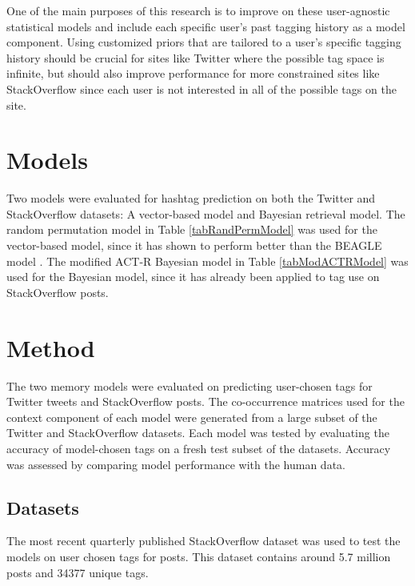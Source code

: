 \documentclass[man,floatsintext,donotrepeattitle]{apa6}
\begin{document}
One of the main purposes of this research is to improve on these user-agnostic statistical models and include each specific user's past tagging history as a model component.
Using customized priors that are tailored to a user's specific tagging history should be crucial for sites like Twitter where the possible tag space is infinite,
but should also improve performance for more constrained sites like StackOverflow since each user is not interested in all of the possible tags on the site. 

\section{Models}

Two models were evaluated for hashtag prediction on both the Twitter and StackOverflow datasets:
A vector-based model and Bayesian retrieval model.
The random permutation model \parencite{Sahlgren2008} in Table \ref{tabRandPermModel} was used for the vector-based model, since it has shown to perform better than the BEAGLE model \parencite{Recchia2010}.
The modified ACT-R Bayesian model \parencite{Stanley2013} in Table \ref{tabModACTRModel} was used for the Bayesian model, since it has already been applied to tag use on StackOverflow posts.

\section{Method}

The two memory models were evaluated on predicting user-chosen tags for Twitter tweets and StackOverflow posts.
The co-occurrence matrices used for the context component of each model were generated from a large subset of the Twitter and StackOverflow datasets.
Each model was tested by evaluating the accuracy of model-chosen tags on a fresh test subset of the datasets.
Accuracy was assessed by comparing model performance with the human data.


\subsection{Datasets}

The most recent quarterly published StackOverflow dataset \parencite{DataDump2013} was used to test the models on user chosen tags for posts.
This dataset contains around \num{5.7} million posts and \num{34377} unique tags.
\end{document}
